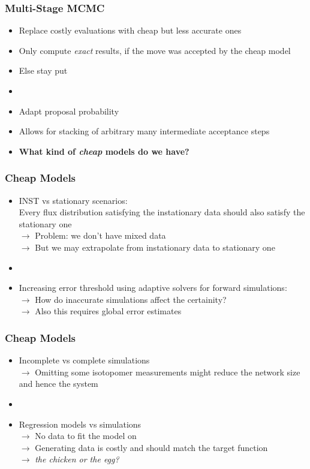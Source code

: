 \begin{frame}
    \frametitle{Multi-Stage MCMC}
    \begin{itemize}
	\item Replace costly evaluations with cheap but less accurate ones
	\item Only compute \emph{exact} results, if the move was accepted by the cheap model
	\item Else stay put
	\item[]
	\item Adapt proposal probability
	\item Allows for stacking of arbitrary many intermediate acceptance steps
	\item \textbf{What kind of \emph{cheap} models do we have?} 
    \end{itemize}
\end{frame}

\begin{frame}
    \frametitle{Cheap Models}
    \begin{itemize}
	\item INST vs stationary scenarios: \\
	    Every flux distribution satisfying the instationary data should also satisfy the stationary one \\
	    $\to$ Problem: we don't have mixed data \\
	    $\to$ But we may extrapolate from instationary data to stationary one
	\item[]
	\item Increasing error threshold using adaptive solvers for forward simulations: \\
	    $\to$ How do inaccurate simulations affect the certainity? \\
	    $\to$ Also this requires global error estimates
    \end{itemize}
\end{frame}

\begin{frame}
    \frametitle{Cheap Models}
    \begin{itemize}
	\item Incomplete vs complete simulations \\
	    $\to$ Omitting some isotopomer measurements might reduce the network size and hence the system
	\item[]
	\item Regression models vs simulations \\
	    $\to$ No data to fit the model on \\ 
	    $\to$ Generating data is costly and should match the target function \\
	    $\to$ \textit{\emph{the chicken or the egg?}}
    \end{itemize}
\end{frame}

